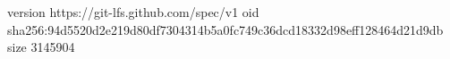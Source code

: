 version https://git-lfs.github.com/spec/v1
oid sha256:94d5520d2e219d80df7304314b5a0fc749c36dcd18332d98eff128464d21d9db
size 3145904
